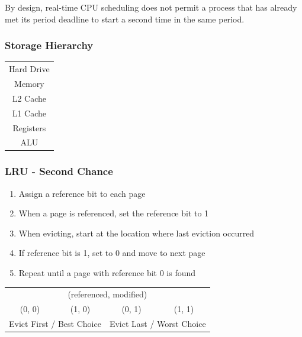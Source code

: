 \documentclass[a4paper]{article}
\begin{document}
\begin{multicols*}{2}
    By design, real-time CPU scheduling does not permit a process that has
    already met its period deadline to start a second time in the same period.

    \setlength{\columnsep}{-15em}
    \begin{multicols*}{2}
        \subsubsection*{Storage Hierarchy}
        \begin{tabular}{|c|}
            \hline
            Hard Drive \\
            Memory     \\
            L2 Cache   \\
            L1 Cache   \\
            Registers  \\
            ALU        \\
            \hline
        \end{tabular}
        \columnbreak
        \begin{flushright}
            \subsubsection*{LRU - Second Chance}
            \begin{enumerate}
                \item Assign a reference bit to each page
                \item When a page is referenced, set the reference bit to 1
                \item When evicting, start at the location where last eviction occurred
                \item If reference bit is 1, set to 0 and move to next page
                \item Repeat until a page with reference bit 0 is found
            \end{enumerate}
        \end{flushright}
    \end{multicols*}

    \vspace*{-2em}
    \begin{center}
        \begin{tabular}{cccc}
            \multicolumn{4}{c}{(referenced, modified)}                                                                      \\
            (0, 0)                                        & (1, 0)                                        & (0, 1) & (1, 1) \\
            \multicolumn{2}{l}{Evict First / Best Choice} & \multicolumn{2}{r}{Evict Last / Worst Choice}
        \end{tabular}
    \end{center}


\end{multicols*}
\end{document}
